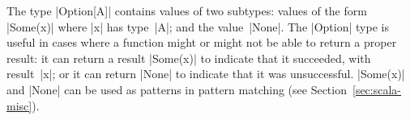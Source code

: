 
The type |Option[A]| contains values of two subtypes:
values of the form |Some(x)| where |x| has type~|A|; and the
value~|None|.
%
The |Option| type is useful in cases where a function might or might not be
able to return a proper result: it can return a result |Some(x)| to indicate
that it succeeded, with result~|x|; or it can return |None| to indicate that
it was unsuccessful.
%
|Some(x)| and |None| can be used as patterns in pattern matching
(see Section~\ref{sec:scala-misc}).%










